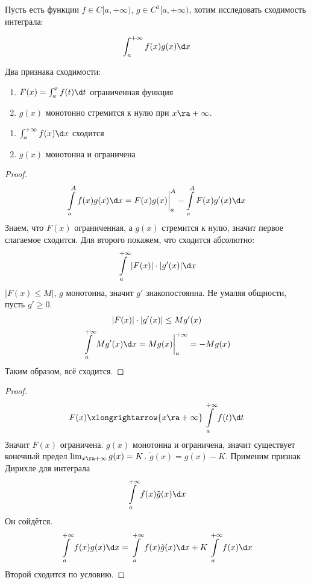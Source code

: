 Пусть есть функции $f \in C[a, +\infty)$, $g \in C^1[a, +\infty)$, хотим исследовать сходимость интеграла:

\[ \int_a^{+\infty} f(x) g(x) \d x \]

Два признака сходимости:
\begin{theorem}
	\begin{enumerate}
		\item $F(x) = \int_a^x f(t) \d t$ ограниченная функция
		\item $g(x)$ монотонно стремится к нулю при $x \ra +\infty$.
	\end{enumerate}
\end{theorem}

\begin{theorem}
	\begin{enumerate}
		\item $\int_a^{+\infty} f(x) \d x$ сходится
		\item $g(x)$ монотонна и ограничена
	\end{enumerate}
\end{theorem}

\begin{proof}
	\[ \int\limits_a^A f(x) g(x) \d x = F(x) g(x) \biggr|_a^A - \int\limits_a^A F(x) g'(x) \d x \]
	Знаем, что $F(x)$ ограниченная, а $g(x)$ стремится к нулю, значит первое слагаемое сходится.
	Для второго покажем, что сходится абсолютно:
	\[ \int\limits_a^{+\infty} |F(x)|\cdot|g'(x)| \d x \]
	$|F(x) \le M|$, $g$ монотонна, значит $g'$ знакопостоянна.
	Не умаляя общности, пусть $g' \ge 0$.
	\begin{gather*}
		|F(x)| \cdot |g'(x)| \le Mg'(x) \\
		\int\limits_a^{+\infty} Mg'(x) \d x = Mg(x) \biggr|_a^{+\infty} = -Mg(x)
	\end{gather*}
	Таким образом, всё сходится.
\end{proof}

\begin{proof}
	\[ F(x) \xlongrightarrow{x \ra +\infty} \int\limits_a^{+\infty} f(t) \d t\]
	Значит $F(x)$ ограничена.
	$g(x)$ монотонна и ограничена, значит существует конечный предел $\lim_{x\ra+\infty} g(x) = K$.
	$\tilde g(x) = g(x) - K$.
	Применим признак Дирихле для интеграла
	\[ \int\limits_a^{+\infty} f(x) \tilde g(x) \d x \]
	Он сойдётся.
	\[ \int\limits_a^{+\infty} f(x) g(x) \d x = \int\limits_a^{+\infty} f(x) \tilde g(x) \d x + K \int\limits_a^{+\infty} f(x) \d x \]
	Второй сходится по условию.
\end{proof}

